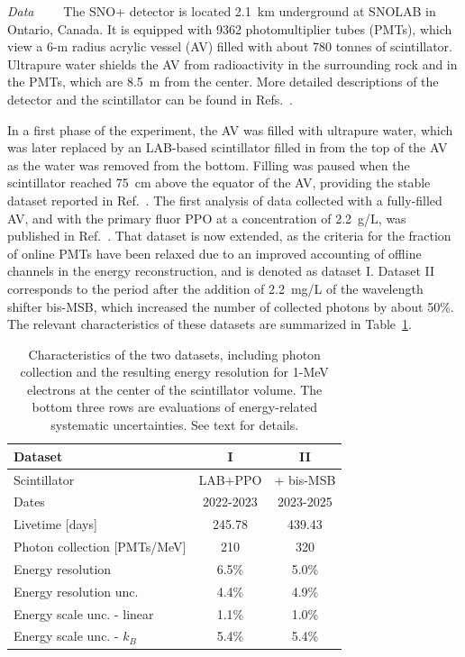 \documentclass[%
 reprint,
superscriptaddress,
 amsmath,amssymb,
 aps,
]{revtex4-2}
\begin{document}
\smallskip
\textit{Data}~~\textemdash~~
The SNO+ detector is located 2.1~km underground at SNOLAB in Ontario, Canada.  It is equipped with 9362 photomultiplier tubes (PMTs), which view a 6-m radius acrylic vessel (AV) filled with about 780 tonnes of scintillator. Ultrapure water shields the AV from radioactivity in the surrounding rock and in the PMTs, which are 8.5~m from the center. 
More detailed descriptions of the detector and the scintillator can be found in Refs.~\cite{sno+detector,sno+scintillator}.

In a first phase of the experiment, the AV was filled with ultrapure water, which was later replaced by an LAB-based scintillator filled in from the top of the AV as the water was removed from the bottom. Filling was paused when the scintillator reached 75~cm above the equator of the AV, providing the stable dataset reported in Ref.~\cite{snoplus_partial_antinu}. 
The first analysis of data collected with a fully-filled AV, and with the primary fluor PPO at a concentration of 2.2~g/L, was published in Ref.~\cite{sno+ppo}. 
That dataset is now extended, as the criteria for the fraction of online PMTs have been relaxed due to an improved accounting of offline channels in the energy reconstruction, and is denoted as dataset I. 
Dataset II corresponds to the period after the addition of 2.2~mg/L of the wavelength shifter bis-MSB, which increased the number of collected photons by about 50\%.  
The relevant characteristics of these datasets are summarized in Table~\ref{tab:datasets}. 

\begin{table}[tbp]
    \centering
    \caption{\label{tab:datasets} Characteristics of the two datasets, including photon collection and the resulting energy resolution for 1-MeV electrons at the center of the scintillator volume.  The bottom three rows are evaluations of energy-related systematic uncertainties.  See text for details.}
\begin{tabular}{lcc}
\toprule \toprule
Dataset & I & II \\
\toprule
Scintillator & LAB+PPO & + bis-MSB\\
Dates & 2022-2023 & 2023-2025\\
Livetime [days] &  245.78 & 439.43  \\
Photon collection [PMTs/MeV] & 210  & 320 \\
Energy resolution & 6.5\% & 5.0\% \\
Energy resolution unc. & 4.4\% & 4.9\% \\
Energy scale unc. - linear & 1.1\% & 1.0\% \\
Energy scale unc. - $k_B$ & 5.4\% & 5.4\% \\
\bottomrule \bottomrule
\end{tabular}
\end{table}
\end{document}
